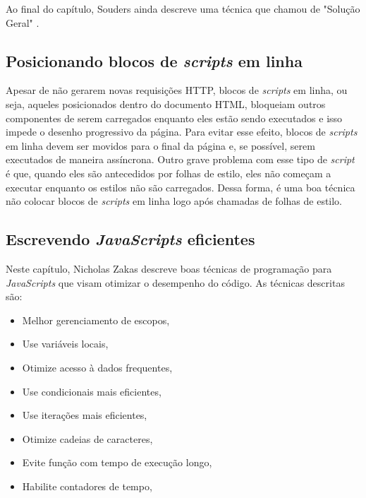 Ao final do capítulo, Souders ainda descreve uma técnica que chamou de "Solução Geral" \cite[p.~59]{EvenFaster}.

\subsection{Posicionando blocos de \textit{scripts} em linha}
\label{subsec:evenfaster_cap6}
Apesar de não gerarem novas requisições HTTP, blocos de \textit{scripts} em linha, ou seja, aqueles posicionados dentro do documento HTML, bloqueiam outros componentes de serem carregados enquanto eles estão sendo executados e isso impede o desenho progressivo da página. Para evitar esse efeito, blocos de \textit{scripts} em linha devem ser movidos para o final da página e, se possível, serem executados de maneira assíncrona. Outro grave problema com esse tipo de \textit{script} é que, quando eles são antecedidos por folhas de estilo, eles não começam a executar enquanto os estilos não são carregados. Dessa forma, é uma boa técnica não colocar blocos de \textit{scripts} em linha logo após chamadas de folhas de estilo.

\subsection{Escrevendo \textit{JavaScripts} eficientes}
\label{subsec:evenfaster_cap7}
Neste capítulo, Nicholas Zakas descreve boas técnicas de programação para \textit{JavaScripts} que visam otimizar o desempenho do código. As técnicas descritas são:

\begin{itemize}
	\item Melhor gerenciamento de escopos, \cite[p.79]{EvenFaster}
	\item Use variáveis locais, \cite[p.~81]{EvenFaster}
	\item Otimize acesso à dados frequentes, \cite[p.~85]{EvenFaster}
	\item Use condicionais mais eficientes, \cite[p.~89]{EvenFaster}
	\item Use iterações mais eficientes, \cite[p.~93]{EvenFaster}
	\item Otimize cadeias de caracteres, \cite[p.~99]{EvenFaster}
	\item Evite função com tempo de execução longo, \cite[p.~102]{EvenFaster}
	\item Habilite contadores de tempo, \cite[p.~103]{EvenFaster}
\end{itemize}

